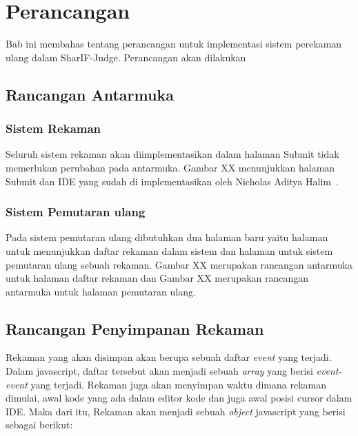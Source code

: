 \chapter{Perancangan}
\label{chap:perancangan}

Bab ini membahas tentang perancangan untuk implementasi sistem perekaman ulang dalam SharIF-Judge. Perancangan akan dilakukan 

\section{Rancangan Antarmuka}

\subsection{Sistem Rekaman}
\label{sub:4:1:rekaman}

Seluruh sistem rekaman akan diimplementasikan dalam halaman Submit tidak memerlukan perubahan pada antarmuka. Gambar XX menunjukkan halaman Submit dan IDE yang sudah di implementasikan oleh Nicholas Aditya Halim~\cite{nicholas:sharif}.

\subsection{Sistem Pemutaran ulang}
\label{sub:4:1:pemutaranulang}

Pada sistem pemutaran ulang dibutuhkan dua halaman baru yaitu halaman untuk menunjukkan daftar rekaman dalam sistem dan halaman untuk sistem pemutaran ulang sebuah rekaman. Gambar XX merupakan rancangan antarmuka untuk halaman daftar rekaman dan Gambar XX merupakan rancangan antarmuka untuk halaman pemutaran ulang.


\section{Rancangan Penyimpanan Rekaman}
\label{sec:4:2:storerekaman}

Rekaman yang akan disimpan akan berupa sebuah daftar \textit{event} yang terjadi. Dalam javascript, daftar tersebut akan menjadi sebuah \textit{array} yang berisi \textit{event-event} yang terjadi. Rekaman juga akan menyimpan waktu dimana rekaman dimulai, awal kode yang ada dalam editor kode dan juga awal posisi cursor dalam IDE. Maka dari itu, Rekaman akan menjadi sebuah \textit{object} javascript yang berisi sebagai berikut:

